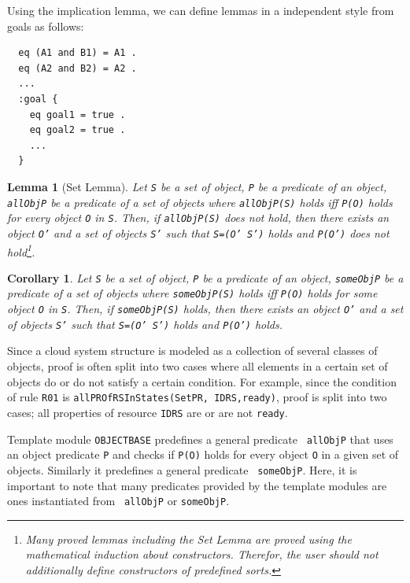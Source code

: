 \documentclass[12pt]{report}
\newtheorem{lemma}{Lemma}
\newtheorem{corollary}{Corollary}
\newcommand{\stt}[1]{{\small{\tt {#1}}}}
\begin{document}
Using the implication lemma, we can define lemmas in a independent
style from goals as follows:
\small
\begin{verbatim}
  eq (A1 and B1) = A1 .
  eq (A2 and B2) = A2 .
  ...
  :goal {
    eq goal1 = true .
    eq goal2 = true .
    ...
  }
\end{verbatim}
\normalsize

\begin{lemma}[Set Lemma]
Let {\tt S} be a set of object, {\tt P} be a predicate of an object,
{\tt allObjP} be a predicate of a set of objects where
\stt{allObjP(S)} holds iff \stt{P(O)} holds for every object {\tt O}
in {\tt S}. Then, if \stt{allObjP(S)} does not hold, then there exists
an object {\tt O'} and a set of objects {\tt S'} such that \stt{S=(O'
  S')} holds and \stt{P(O')} does not hold\footnote{Many proved lemmas
  including the Set Lemma are proved using the mathematical induction
  about constructors. Therefor, the user should not additionally define
  constructors of predefined sorts.}.
\end{lemma}
\begin{corollary}
Let {\tt S} be a set of object, {\tt P} be a predicate of an object,
{\tt someObjP} be a predicate of a set of objects where
\stt{someObjP(S)} holds iff \stt{P(O)} holds for some object {\tt O}
in {\tt S}. Then, if \stt{someObjP(S)} holds, then there exists an
object {\tt O'} and a set of objects {\tt S'} such that \stt{S=(O'
  S')} holds and \stt{P(O')} holds.
\end{corollary}
Since a cloud system structure is modeled as a collection of several
classes of objects, proof is often split into two cases where all
elements in a certain set of objects do or do not satisfy a certain
condition.  For example, since the condition of rule {\tt R01} is 
\stt{allPROfRSInStates(SetPR, IDRS,ready)}, proof is split into two
cases; all properties of resource {\tt IDRS} are or are not
{\tt ready}.

Template module {\tt OBJECTBASE} predefines a general predicate {\tt
  allObjP} that uses an object predicate {\tt P} and checks if
\stt{P(O)} holds for every object {\tt O} in a given set of
objects. Similarly it predefines a general predicate {\tt
  someObjP}. Here, it is important to note that many predicates
provided by the template modules are ones instantiated from {\tt
  allObjP} or {\tt someObjP}.
\end{document}
